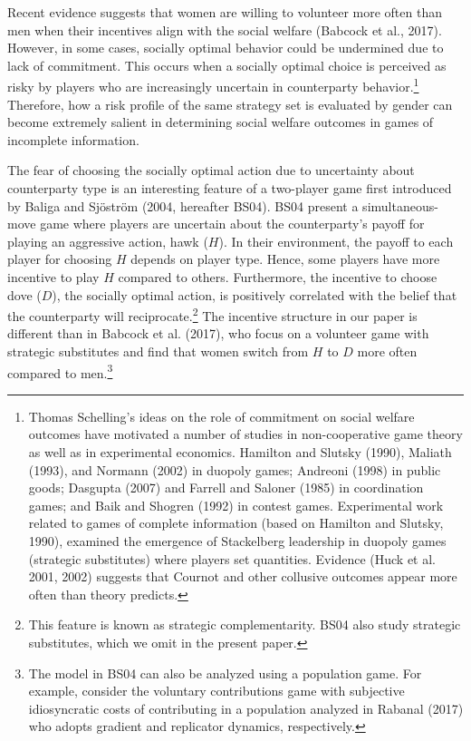 \documentclass[11pt,english]{article}
\begin{document}
Recent evidence suggests that women are willing to volunteer more often than men when their incentives align with the social welfare (Babcock et al., 2017). However, in some cases, socially optimal behavior could be undermined due to lack of commitment. This occurs when a socially optimal choice is perceived as risky by players who are increasingly uncertain in counterparty behavior.\footnote{Thomas Schelling's ideas on the role of commitment on social welfare outcomes have motivated a number of studies in non-cooperative game theory as well as in experimental economics. Hamilton and Slutsky (1990), Maliath (1993), and Normann (2002) in duopoly games; Andreoni (1998) in public goods;  Dasgupta (2007) and Farrell and Saloner (1985) in coordination games; and Baik and Shogren (1992) in contest games. Experimental work related to games of complete information (based on Hamilton and Slutsky, 1990), examined the emergence of Stackelberg leadership in duopoly games (strategic substitutes) where players set quantities. Evidence (Huck et al. 2001, 2002) suggests that Cournot and other collusive outcomes appear more often than theory predicts.} Therefore, how a risk profile of the same strategy set is evaluated by gender can become extremely salient in determining social welfare outcomes in games of incomplete information.

The fear of choosing the socially optimal action due to uncertainty about counterparty type is an interesting feature of a two-player game first introduced by Baliga and Sj\"ostr\"om (2004, hereafter BS04). BS04 present a simultaneous-move game where players are uncertain about the counterparty's payoff for playing an aggressive action, hawk ($H$). In their environment, the payoff to each player for choosing $H$ depends on player type. Hence, some players have more incentive to play $H$ compared to others. Furthermore, the incentive to choose dove ($D$), the socially optimal action, is positively correlated with the belief that the counterparty will reciprocate.\footnote{This feature is known as strategic complementarity. BS04 also study strategic substitutes, which we omit in the present paper.} The incentive structure in our paper is different than in Babcock et al. (2017), who focus on a volunteer game with strategic substitutes and find that women switch from $H$ to $D$ more often compared to men.\footnote{The model in BS04 can also be analyzed using a population game. For example, consider the voluntary contributions game with subjective idiosyncratic costs of contributing in a population analyzed in Rabanal (2017) who adopts gradient and replicator dynamics, respectively.}
\end{document}
